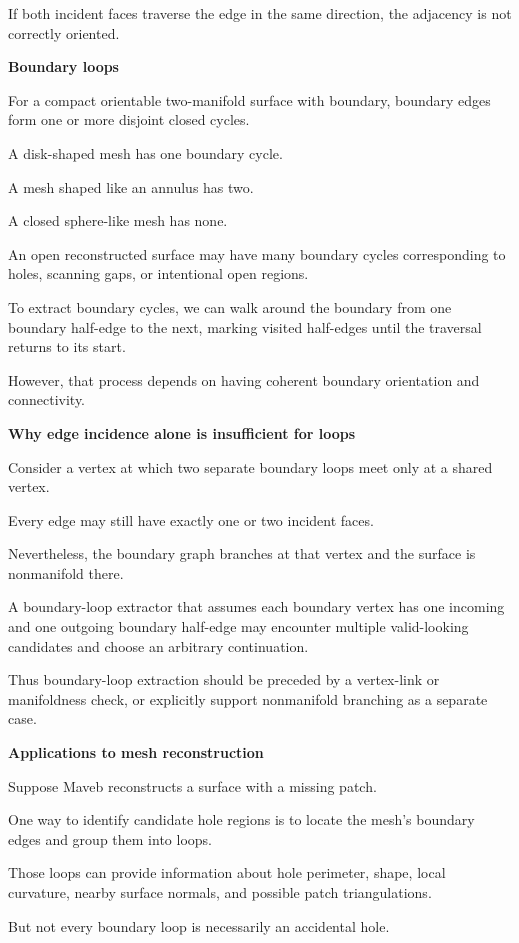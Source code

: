 If both incident faces traverse the edge in the same direction, the adjacency is not correctly oriented.

\textbf{Boundary loops}

For a compact orientable two-manifold surface with boundary, boundary edges form one or more disjoint closed cycles.

A disk-shaped mesh has one boundary cycle.

A mesh shaped like an annulus has two.

A closed sphere-like mesh has none.

An open reconstructed surface may have many boundary cycles corresponding to holes, scanning gaps, or intentional open regions.

To extract boundary cycles, we can walk around the boundary from one boundary half-edge to the next, marking visited half-edges until the traversal returns to its start.

However, that process depends on having coherent boundary orientation and connectivity.

\textbf{Why edge incidence alone is insufficient for loops}

Consider a vertex at which two separate boundary loops meet only at a shared vertex.

Every edge may still have exactly one or two incident faces.

Nevertheless, the boundary graph branches at that vertex and the surface is nonmanifold there.

A boundary-loop extractor that assumes each boundary vertex has one incoming and one outgoing boundary half-edge may encounter multiple valid-looking candidates and choose an arbitrary continuation.

Thus boundary-loop extraction should be preceded by a vertex-link or manifoldness check, or explicitly support nonmanifold branching as a separate case.

\textbf{Applications to mesh reconstruction}

Suppose Maveb reconstructs a surface with a missing patch.

One way to identify candidate hole regions is to locate the mesh's boundary edges and group them into loops.

Those loops can provide information about hole perimeter, shape, local curvature, nearby surface normals, and possible patch triangulations.

But not every boundary loop is necessarily an accidental hole.

